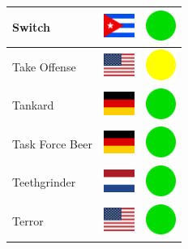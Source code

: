 \documentclass[12pt, a4paper, twoside]{report}
\begin{document}
\begin{center}
\begin{longtable}{|p{5cm}|p{2cm}|p{2cm}|}
 Switch                                                     & \includegraphics[width=1cm]{4x3/cu} &   \includegraphics[width=1cm]{likes/y} \\ \hline
 Take Offense                                               & \includegraphics[width=1cm]{4x3/us} &   \includegraphics[width=1cm]{likes/m} \\ \hline
 Tankard                                                    & \includegraphics[width=1cm]{4x3/de} &   \includegraphics[width=1cm]{likes/y} \\ \hline
 Task Force Beer                                            & \includegraphics[width=1cm]{4x3/de} &   \includegraphics[width=1cm]{likes/y} \\ \hline
 Teethgrinder                                               & \includegraphics[width=1cm]{4x3/nl} &   \includegraphics[width=1cm]{likes/y} \\ \hline
 Terror                                                     & \includegraphics[width=1cm]{4x3/us} &   \includegraphics[width=1cm]{likes/y} \\ \hline

\end{longtable}
\end{center}
\end{document}
